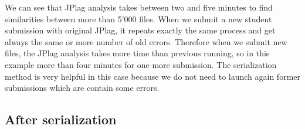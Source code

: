 \documentclass[twoside]{article}
\begin{document}
\begin{multicols*}{2}
\begin{table}[H]
\caption{Original JPlag's performance}
\end{table}

We can see that JPlag analysis takes between two and five minutes to find similarities between more than 5'000 files. When we submit a new student submission with original JPlag, it repeats exactly the same process and get always the same or more number of old errors. Therefore when we submit new files, the JPlag analysis takes more time than previous running, so in this example more than four minutes for one more submission. The serialization method is very helpful in this case because we do not need to launch again former submissions which are contain some errors. 

\subsection{After serialization}


\end{multicols*}
\end{document}
